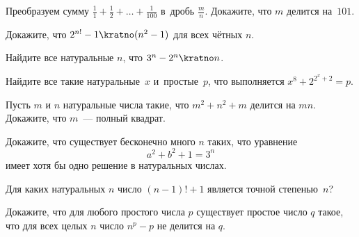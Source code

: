 


\begin{problems}

\item
Преобразуем сумму $\frac{1}{1} + \frac{1}{2} + \ldots + \frac{1}{100}$
в~дробь $\frac{m}{n}$.
Докажите, что $m$ делится на~$101$.

\item
Докажите, что $2^{n!} - 1 \kratno (n^2 - 1)$ для всех чётных $n$.

\item
Найдите все натуральные $n$, что $3^{n} - 2^{n} \kratno n$.

\item
Найдите все такие натуральные~$x$ и~простые~$p$, что выполняется
$x^8 + 2^{2^{x} + 2} = p$.

\item
Пусть $m$ и $n$ натуральные числа такие, что $m^2 + n^2 + m$ делится на $m n$.
Докажите, что $m$~--- полный квадрат.

\item
Докажите, что существует бесконечно много $n$ таких, что уравнение
\[ a^2 + b^2 + 1 = 3^{n} \]
имеет хотя бы одно решение в натуральных числах.

\item
Для каких натуральных $n$ число $(n - 1)! + 1$ является точной степенью~$n$?

\item
Докажите, что для любого простого числа $p$ существует простое число $q$ такое,
что для всех целых $n$ число $n^{p} - p$ не делится на $q$.

\end{problems}

